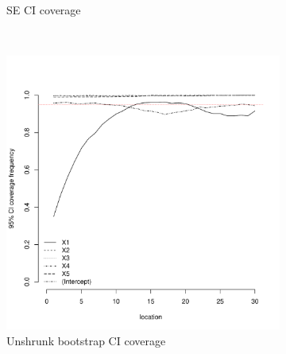 \documentclass[authoryear, review, 11pt]{elsarticle}
\begin{document}
\begin{figure}
\begin{subfigure}[b]{0.45\textwidth}
		\caption{SE CI coverage}
	\end{subfigure}%
	\\%
	\begin{subfigure}[b]{0.45\textwidth}
	\centering
		\includegraphics[width=\textwidth]{../../figures/simulation/15.14.profile_unshrunk_bootstrap_coverage.pdf}
		\caption{Unshrunk bootstrap CI coverage}
	\end{subfigure}%
	~ %
	\begin{subfigure}[b]{0.45\textwidth}
	\centering

\end{subfigure}
\end{figure}
\end{document}
